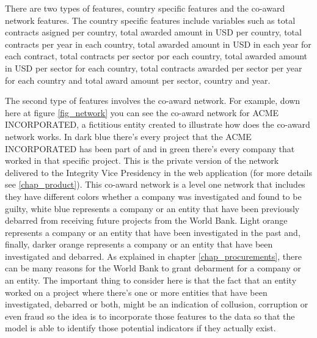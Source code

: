 There are two types of features, country specific features and the co-award network features. The country specific features include variables such as total contracts  asigned per country,  total awarded amount in USD per country, total contracts per year in each country, total awarded amount in USD in each year for each contract, total contracts per sector por each country, total awarded amount in USD per sector for each country, total contracts awarded per sector per year for each country and total award amount per sector, country and year.

The second type of features involves the co-award network.  For example, down here at figure \ref{fig_network} you can see the co-award network for ACME INCORPORATED, a fictitious entity created to illustrate how does the co-award network works.  In dark blue there's every project that  the ACME INCORPORATED has been part of and in green there's every company that worked in that specific project. This is the private version of the network delivered to the Integrity Vice Presidency in the web application (for more details see \ref{chap_product}). This co-award network is a level one network that includes they have different colors whether a company was investigated and found to be guilty, white blue represents a company or an entity that have been previously debarred from receiving future projects from the World Bank. Light orange represents a company or an entity that have been investigated in the past and, finally, darker orange represents a company or an entity that have been investigated and debarred. As explained in chapter \ref{chap_procurements}, there can be many reasons for the World Bank to grant debarment for a company or an entity. The important thing to consider here is that the fact that an entity worked on a project where there's one or more entities that have been investigated, debarred or both, might be an indication of collusion, corruption or even fraud so the idea is to incorporate  those features to the data so that the model is able to identify those potential indicators if they actually exist.


